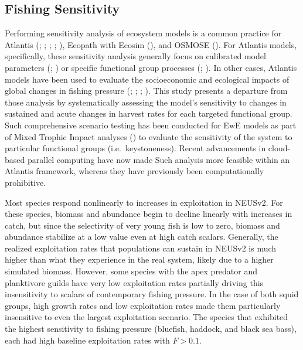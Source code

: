 \documentclass[
]{article}
\begin{document}
\subsection{Fishing Sensitivity}\label{fishing-sensitivity}

Performing sensitivity analysis of ecosystem models is a common practice for Atlantis (; ; ; ; ), Ecopath with Ecosim (), and OSMOSE (). For Atlantis models, specifically, these sensitivity analysis generally focus on calibrated model parameters (; ) or specific functional group processes (; ). In other cases, Atlantis models have been used to evaluate the socioeconomic and ecological impacts of global changes in fishing pressure (; ; ; ). This study presents a departure from those analysis by systematically assessing the model's sensitivity to changes in sustained and acute changes in harvest rates for each targeted functional group. Such comprehensive scenario testing has been conducted for EwE models as part of Mixed Trophic Impact analyses () to evaluate the sensitivity of the system to particular functional groups (i.e.~keystoneness). Recent advancements in cloud-based parallel computing have now made Such analysis more feasible within an Atlantis framework, whereas they have previously been computationally prohibitive.

Most species respond nonlinearly to increases in exploitation in NEUSv2. For these species, biomass and abundance begin to decline linearly with increases in catch, but since the selectivity of very young fish is low to zero, biomass and abundance stabilize at a low value even at high catch scalars. Generally, the realized exploitation rates that populations can sustain in NEUSv2 is much higher than what they experience in the real system, likely due to a higher simulated biomass. However, some species with the apex predator and planktivore guilds have very low exploitation rates partially driving this insensitivity to scalars of contemporary fishing pressure. In the case of both squid groups, high growth rates and low exploitation rates made them particularly insensitive to even the largest exploitation scenario. The species that exhibited the highest sensitivity to fishing pressure (bluefish, haddock, and black sea bass), each had high baseline exploitation rates with \(F>0.1\).
\end{document}
